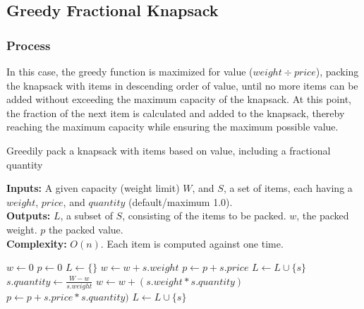 \pagebreak
\subsection*{Greedy Fractional Knapsack}
\subsubsection*{Process}

In this case, the greedy function is maximized for value ($weight \div price$), packing the knapsack with items in descending order of value, until no more items can be added without exceeding the maximum capacity of the knapsack. At this point, the fraction of the next item is calculated and added to the knapsack, thereby reaching the maximum capacity while ensuring the maximum possible value.

\begin{algorithm}[H]
\caption{Greedily pack a knapsack with items based on value, including a fractional quantity}
\textbf{Inputs:} A given capacity (weight limit) $W$, and $S$, a set of items, each having a $weight$, $price$, and $quantity$ (default/maximum 1.0). \\
\textbf{Outputs:} $L$, a subset of $S$, consisting of the items to be packed. $w$, the packed weight. $p$ the packed value. \\
\textbf{Complexity:} $O(n)$. Each item is computed against one time. \\[-0.8em]
\hline
\begin{algorithmic}[1]
  \State {} 
  \State $w \leftarrow 0$ 
  \State $p \leftarrow 0$ 
  \State $L \leftarrow \{\}$
     
      \State $w \leftarrow w + s.weight$ 
      \State $p \leftarrow p + s.price$ 
      \State $L \leftarrow L\cup\{s\}$ 
    \Else
      \State $s.quantity \leftarrow \frac{W - w}{s.weight}$ 
      \State $w \leftarrow w + (s.weight * s.quantity)$ 
      \State $p \leftarrow p + s.price * s.quantity)$ 
      \State $L \leftarrow L\cup\{s\}$ 
    \EndIf
  \EndFor
\end{algorithmic}
\end{algorithm}

